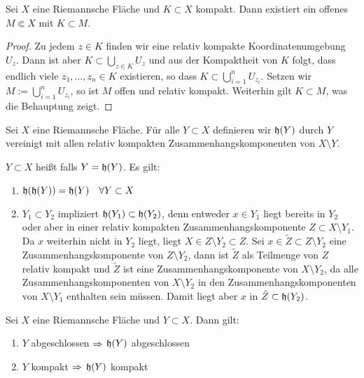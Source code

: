 \begin{lemma}
  \label{lemma:komp-enthalten}
  Sei $X$ eine Riemannsche Fläche und $K \subset X$ kompakt. Dann
  existiert ein offenes $M \Subset X$ mit $K \subset M$.
\end{lemma}

\begin{proof}
  Zu jedem $z \in K$ finden wir eine relativ kompakte
  Koordinatenumgebung $U_z$. Dann ist aber $K \subset \bigcup_{z \in
    K}U_z$ und aus der Kompaktheit von $K$ folgt, dass endlich viele
  $z_1, \dots, z_n \in K$ existieren, so dass $K \subset
  \bigcup_{i=1}^n U_{z_i}$. Setzen wir $M := \bigcup_{i=1}^n U_{z_i}$,
  so ist $M$ offen und relativ kompakt. Weiterhin gilt $K \subset M$,
  was die Behauptung zeigt.
\end{proof}

\begin{defin}
  Sei $X$ eine Riemannsche Fläche. Für alle $Y \subset X$ definieren
  wir $\mathfrak{h}(Y)$ durch $Y$ vereinigt mit allen relativ kompakten
  Zusammenhangskomponenten von $X \setminus Y$.

  $Y \subset X$ heißt  falls $Y = \mathfrak{h}(Y)$. Es gilt:
  \begin{enumerate}
  \item $\mathfrak{h}(\mathfrak{h}(Y)) = \mathfrak{h}(Y) \quad \forall Y \subset X$
  \item $Y_1 \subset Y_2$ impliziert $\mathfrak{h}(Y_1) \subset
    \mathfrak{h}(Y_2)$, denn entweder $x \in Y_1$ liegt bereits in $Y_2$
    oder aber in einer relativ kompakten Zusammenhangskomponente $Z
    \subset X \setminus Y_1$. Da $x$ weiterhin nicht in $Y_2$ liegt,
    liegt $X \in Z \setminus Y_2 \subset Z$. Sei $x \in \tilde Z
    \subset Z \setminus Y_2$ eine Zusammenhangskomponente von $Z
    \setminus Y_2$, dann ist $\tilde Z$ als Teilmenge von $Z$ relativ
    kompakt und $\tilde Z$ ist eine Zusammenhangskomponente von $X
    \setminus Y_2$, da alle Zusammenhangskomponenten von $X \setminus
    Y_2$ in den Zusammenhangskomponenten von $X \setminus Y_1$
    enthalten sein müssen. Damit liegt aber $x$ in $\tilde Z \subset \mathfrak{h}(Y_2)$.
  \end{enumerate}
\end{defin}

\begin{thm}
  Sei $X$ eine Riemannsche Fläche und $Y \subset X$. Dann gilt:
  \begin{enumerate}
  \item $Y$ abgeschlossen $\Rightarrow$ $\mathfrak{h}(Y)$ abgeschlossen
  \item $Y$ kompakt $\Rightarrow$ $\mathfrak{h}(Y)$ kompakt
  \end{enumerate}
\end{thm}

